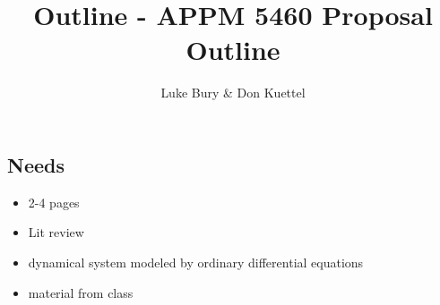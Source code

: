 \documentclass{article}
\title{Outline - APPM 5460 Proposal Outline}
\author{Luke Bury \& Don Kuettel}
\begin{document}
\maketitle


\subsection{Needs}
\begin{itemize}
  \item 2-4 pages
  \item Lit review
  \item dynamical system modeled by ordinary differential equations
  \item material from class\\\\\\
\end{itemize}
\end{document}
